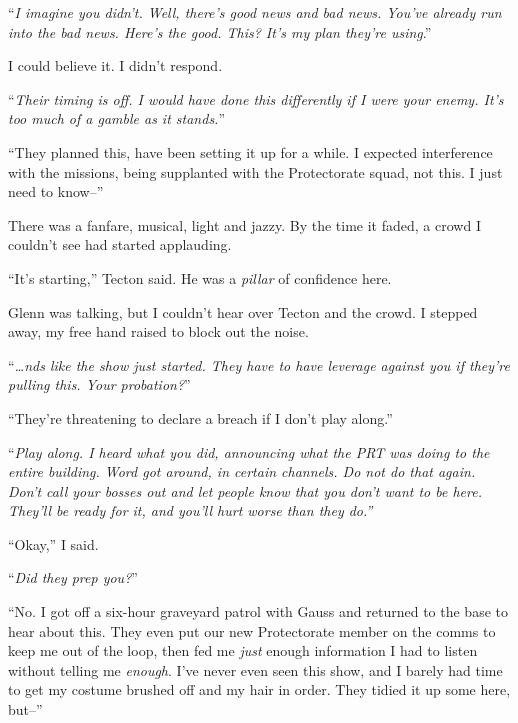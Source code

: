 ``\emph{I imagine you didn't.  Well, there's good news and bad news.  You've already run into the bad news.  Here's the good.  This?  It's my plan they're using}.''



I could believe it.  I didn't respond.



``\emph{Their timing is off.  I would have done this differently if I were your enemy.  It's too much of a gamble as it stands.}''



``They planned this, have been setting it up for a while.  I expected interference with the missions, being supplanted with the Protectorate squad, not this.  I just need to know--''



There was a fanfare, musical, light and jazzy.  By the time it faded, a crowd I couldn't see had started applauding.



``It's starting,'' Tecton said.  He was a \emph{pillar} of confidence here.



Glenn was talking, but I couldn't hear over Tecton and the crowd.  I stepped away, my free hand raised to block out the noise.



``\emph{\ldots{}nds like the show just started.  They have to have leverage against you if they're pulling this.  Your probation?}''



``They're threatening to declare a breach if I don't play along.''



``\emph{Play along.  I heard what you did, announcing what the PRT was doing to the entire building.  Word got around, in certain channels.  Do not do that again.  Don't call your bosses out and let people know that you don't want to be here.  They'll be ready for it, and you'll hurt worse than they do.''}



``Okay,'' I said.



``\emph{Did they prep you?}''



``No.   I got off a six-hour graveyard patrol with Gauss and returned to the base to hear about this.  They even put our new Protectorate member on the comms to keep me out of the loop, then fed me \emph{just} enough information I had to listen without telling me \emph{enough}.  I've never even seen this show, and I barely had time to get my costume brushed off and my hair in order.  They tidied it up some here, but--''



